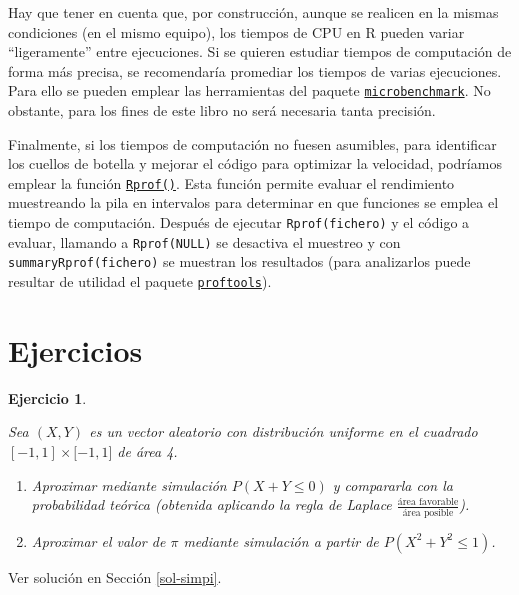\documentclass[
  10pt,
]{book}
\theoremstyle{break}
\newtheorem{exercise}{Ejercicio}[chapter]
\theoremstyle{nonumberplain}
\begin{document}
Hay que tener en cuenta que, por construcción, aunque se realicen en la mismas condiciones (en el mismo equipo), los tiempos de CPU en R pueden variar ``ligeramente'' entre ejecuciones.
Si se quieren estudiar tiempos de computación de forma más precisa, se recomendaría promediar los tiempos de varias ejecuciones.
Para ello se pueden emplear las herramientas del paquete \href{https://github.com/joshuaulrich/microbenchmark/}{\texttt{microbenchmark}}.
No obstante, para los fines de este libro no será necesaria tanta precisión.

Finalmente, si los tiempos de computación no fuesen asumibles, para identificar los cuellos de botella y mejorar el código para optimizar la velocidad, podríamos emplear la función \href{https://rdrr.io/r/utils/Rprof.html}{\texttt{Rprof()}}.
Esta función permite evaluar el rendimiento muestreando la pila en intervalos para determinar en que funciones se emplea el tiempo de computación.
Después de ejecutar \texttt{Rprof(fichero)} y el código a evaluar, llamando a \texttt{Rprof(NULL)} se desactiva el muestreo y con \texttt{summaryRprof(fichero)} se muestran los resultados (para analizarlos puede resultar de utilidad el paquete \href{https://CRAN.R-project.org/package=proftools}{\texttt{proftools}}).

\hypertarget{ejercicios}{%
\section{Ejercicios}\label{ejercicios}}

\begin{exercise}
\protect\hypertarget{exr:simpi}{}\label{exr:simpi}

Sea \((X,Y)\) es un vector aleatorio con distribución uniforme en el
cuadrado \([-1,1]\times\lbrack-1,1]\) de área 4.

\begin{enumerate}
\def\labelenumi{\alph{enumi})}
\item
  Aproximar mediante simulación \(P\left(X + Y \leq 0 \right)\) y
  compararla con la probabilidad teórica (obtenida aplicando la
  regla de Laplace \(\frac{\text{área favorable}}{\text{área posible}}\)).
\item
  Aproximar el valor de \(\pi\) mediante simulación a partir de
  \(P\left( X^2 +Y^2 \leq 1 \right)\).
\end{enumerate}

\end{exercise}

Ver solución en Sección \ref{sol-simpi}.
\end{document}
